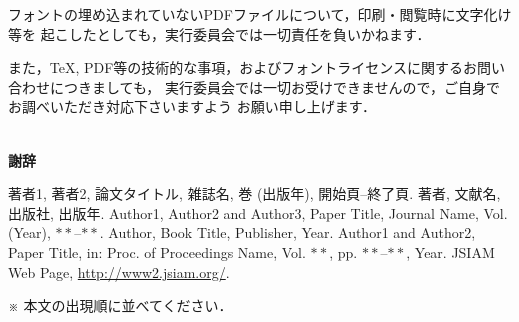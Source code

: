 \documentclass[11pt,a4j]{jarticle}
\def\thanks{~\\[.5\baselineskip]{\bf 謝辞}\hspace*{1zw}}
\begin{document}
フォントの埋め込まれていないPDFファイルについて，印刷・閲覧時に文字化け等を
起こしたとしても，実行委員会では一切責任を負いかねます．

また，{\TeX}, PDF等の技術的な事項，およびフォントライセンスに関するお問い合わせにつきましても，
実行委員会では一切お受けできませんので，ご自身でお調べいただき対応下さいますよう
お願い申し上げます．

\thanks
%
\dotfill \\ \dotfill
%
\begin{thebibliography}{10}
%
著者1, 著者2, 論文タイトル, 雑誌名, 巻 (出版年), 開始頁--終了頁.
%
著者, 文献名, 出版社, 出版年.
%
Author1, Author2 and Author3, Paper Title, Journal Name, Vol. (Year), $\ast\ast$--$\ast\ast$.
%
Author, Book Title, Publisher, Year.
%
Author1 and Author2, Paper Title, in: Proc. of Proceedings Name, Vol. $\ast\ast$, pp. $\ast\ast$--$\ast\ast$, Year.
%
JSIAM Web Page, \url{http://www2.jsiam.org/}.
\end{thebibliography}
※ 本文の出現順に並べてください．
%
\end{document}
